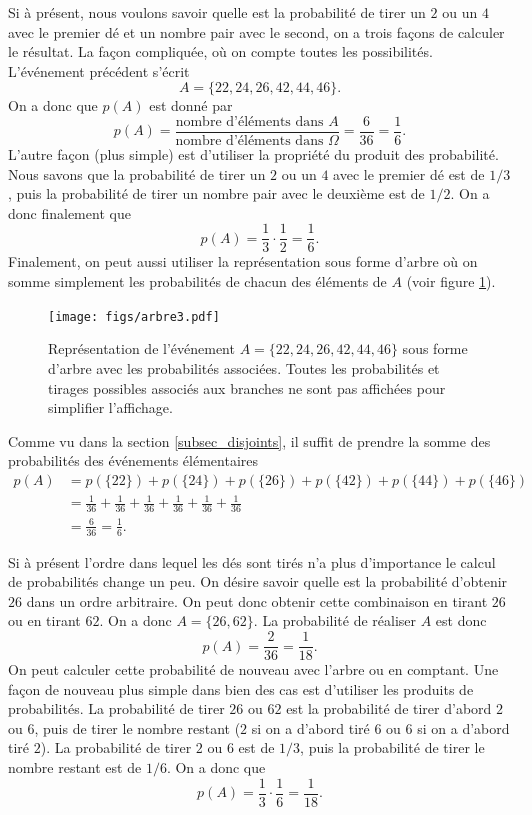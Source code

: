 \documentclass[a4paper,12pt]{book}
\begin{document}
Si à présent, nous voulons savoir quelle est la probabilité de tirer un $2$ ou un $4$ avec le premier dé et un nombre pair avec le second,
on a trois façons de calculer le résultat. La façon compliquée, où on compte toutes les possibilités. L'événement 
précédent s'écrit
\begin{equation}
 A=\{22,24,26,42,44,46\}.
\end{equation}
On a donc que $p(A)$ est donné par
\begin{equation}
 p(A)=\frac{\mbox{nombre d'éléments dans }A}{\mbox{nombre d'éléments dans }\Omega}=\frac{6}{36}=\frac{1}{6}.
\end{equation}
L'autre façon (plus simple) est d'utiliser la propriété du produit des probabilité. Nous savons que la probabilité de tirer un 
$2$ ou un $4$ avec le premier dé est de $1/3$, puis la probabilité de tirer un nombre pair avec le deuxième est de 
$1/2$. On a donc finalement que
\begin{equation}
 p(A)=\frac{1}{3}\cdot\frac{1}{2}=\frac{1}{6}.
\end{equation}
Finalement, on peut aussi utiliser la représentation sous forme d'arbre
où on somme simplement les probabilités de chacun des éléments de $A$
(voir figure \ref{fig_arbre3}).
\begin{figure}[htp]
\texttt{[image: figs/arbre3.pdf]}
\caption{Représentation de l'événement $A=\{22,24,26,42,44,46\}$ sous forme d'arbre avec les probabilités associées.
Toutes les probabilités et tirages possibles associés aux branches ne sont pas affichées pour simplifier
l'affichage.}\label{fig_arbre3}
\end{figure}
Comme vu dans la section \ref{subsec_disjoints}, il suffit de prendre la somme des 
probabilités des événements élémentaires
\begin{align}
 p(A)&=p(\{22\})+p(\{24\})+p(\{26\})+p(\{42\})+p(\{44\})+p(\{46\})\nonumber\\
     &=\frac{1}{36}+\frac{1}{36}+\frac{1}{36}+\frac{1}{36}+\frac{1}{36}+\frac{1}{36}\nonumber\\
     &=\frac{6}{36}=\frac{1}{6}.
\end{align}

Si à présent l'ordre dans lequel les dés sont tirés n'a plus d'importance le calcul de probabilités change un peu.
On désire savoir quelle est la probabilité d'obtenir $26$ dans un ordre arbitraire. On peut donc obtenir
cette combinaison en tirant $26$ ou en tirant $62$. On a donc $A=\{26,62\}$. La probabilité de réaliser $A$
est donc
\begin{equation}
 p(A)=\frac{2}{36}=\frac{1}{18}.
\end{equation}
On peut calculer cette probabilité de nouveau avec l'arbre ou en comptant. Une façon de nouveau plus simple
dans bien des cas est d'utiliser les produits de probabilités. La probabilité de tirer
$26$ ou $62$ est la probabilité de tirer d'abord $2$ ou $6$, puis de tirer le nombre restant ($2$ si on a d'abord tiré $6$
ou $6$ si on a d'abord tiré $2$). La probabilité de tirer $2$ ou $6$ est de $1/3$, puis la probabilité de tirer
le nombre restant est de $1/6$. On a donc que
\begin{equation}
 p(A)=\frac{1}{3}\cdot \frac{1}{6}=\frac{1}{18}.
\end{equation}
\end{document}
